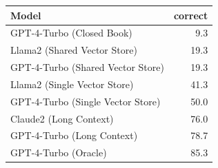 \begin{tabular}{lr}
\toprule
Model & correct \\
\midrule
GPT-4-Turbo (Closed Book) & 9.3 \\
Llama2 (Shared Vector Store) & 19.3 \\
GPT-4-Turbo (Shared Vector Store) & 19.3 \\
Llama2 (Single Vector Store) & 41.3 \\
GPT-4-Turbo (Single Vector Store) & 50.0 \\
Claude2 (Long Context) & 76.0 \\
GPT-4-Turbo (Long Context) & 78.7 \\
GPT-4-Turbo (Oracle) & 85.3 \\
\bottomrule
\end{tabular}
